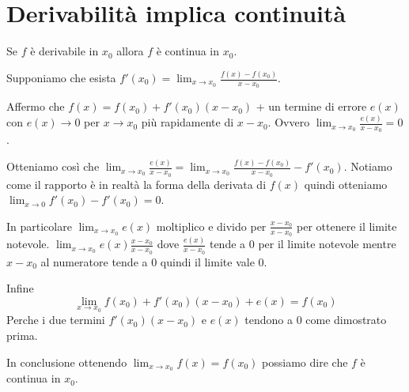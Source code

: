 \section{Derivabilità implica continuità}
    Se $f$ è derivabile in $x_0$ allora $f$ è continua in $x_0$.
    \begin{dimostration}
        Supponiamo che esista $f'(x_0)=\lim_{x\to x_0}\frac{f(x)-f(x_0)}{x-x_0}$.
        
        Affermo che $f(x)=f(x_0)+f'(x_0)(x-x_0)$ + un termine di errore $e(x)$ con $e(x)\to 0$ per $x\to x_0$ più rapidamente di $x-x_0$. Ovvero $\lim_{x\to x_0}\frac{e(x)}{x-x_0}=0$.
        
        Otteniamo così che $\lim_{x\to x_0}\frac{e(x)}{x-x_0}=\lim_{x\to x_0}\frac{f(x)-f(x_0)}{x-x_0}-f'(x_0)$.
        Notiamo come il rapporto è in realtà la forma della derivata di $f(x)$ quindi otteniamo $\lim_{x\to 0}f'(x_0)-f'(x_0)=0$.
        
        In particolare $\lim_{x\to x_0}e(x)$ moltiplico e divido per $\frac{x-x_0}{x-x_0}$ per ottenere il limite notevole. $\lim_{x\to x_0}e(x)\frac{x-x_0}{x-x_0}$ dove $\frac{e(x)}{x-x_0}$ tende a 0 per il limite notevole mentre $x-x_0$ al numeratore tende a 0 quindi il limite vale 0.
        
        Infine
        \begin{equation*}
            \lim_{x\to x_0}f(x_0)+f'(x_0)(x-x_0)+e(x)=f(x_0)
        \end{equation*}
        Perche i due termini $f'(x_0)(x-x_0)$ e $e(x)$ tendono a 0 come dimostrato prima.
        
        In conclusione ottenendo $\lim_{x\to x_0}f(x)=f(x_0)$ possiamo dire che $f$ è continua in $x_0$. \flushright{$\blacksquare$}
    \end{dimostration}

